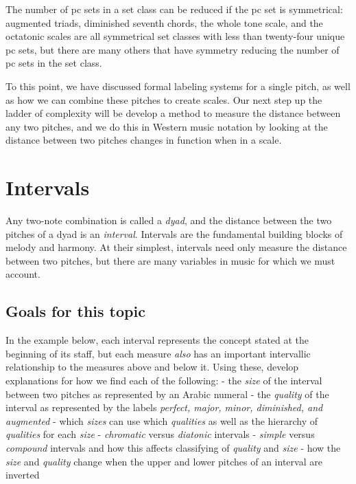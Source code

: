 \documentclass{book}
\begin{document}
The number of pc sets in a set class can be reduced if the pc set is
symmetrical: augmented triads, diminished seventh chords, the whole tone
scale, and the octatonic scales are all symmetrical set classes with less than
twenty-four unique pc sets, but there are many others that have symmetry
reducing the number of pc sets in the set class.

To this point, we have discussed formal labeling systems for a single pitch,
as well as how we can combine these pitches to create scales. Our next step up
the ladder of complexity will be develop a method to measure the distance
between any two pitches, and we do this in Western music notation by looking
at the distance between two pitches changes in function when in a scale.

\hypertarget{intervals}{%
\section{Intervals}\label{intervals}}

Any two-note combination is called a \emph{dyad}, and the distance between the
two pitches of a dyad is an \emph{interval}. Intervals are the fundamental
building blocks of melody and harmony. At their simplest, intervals need only
measure the distance between two pitches, but there are many variables in
music for which we must account.

\hypertarget{goals-for-this-topic-12}{%
\subsection{Goals for this topic}\label{goals-for-this-topic-12}}

In the example below, each interval represents the concept stated at the
beginning of its staff, but each measure \emph{also} has an important
intervallic relationship to the measures above and below it. Using these,
develop explanations for how we find each of the following: - the \emph{size}
of the interval between two pitches as represented by an Arabic numeral - the
\emph{quality} of the interval as represented by the labels \emph{perfect,
major, minor, diminished, and augmented} - which \emph{sizes} can use which
\emph{qualities} as well as the hierarchy of \emph{qualities} for each
\emph{size} - \emph{chromatic} versus \emph{diatonic} intervals -
\emph{simple} versus \emph{compound} intervals and how this affects
classifying of \emph{quality} and \emph{size} - how the \emph{size} and
\emph{quality} change when the upper and lower pitches of an interval are
inverted
\end{document}
